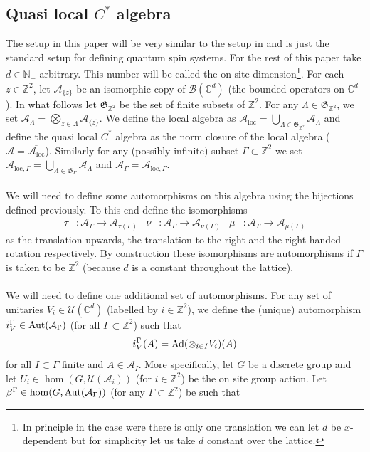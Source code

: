 \documentclass[12pt,a4paper,twoside]{article}
\let\originalleft\left
\let\originalright\right
\renewcommand{\left}{\mathopen{}\mathclose\bgroup\originalleft}
\renewcommand{\right}{\aftergroup\egroup\originalright}
\newcommand{\UU}{\mathcal U}
\newcommand{\BB}{\mathcal B}
\newcommand{\ZZ}{\mathbb Z}
\newcommand{\CC}{\mathbb C}
\renewcommand{\AA}{\mathcal A}
\newcommand{\NN}{\mathbb{N}}
\newcommand{\Ad}[1]{\textrm{Ad}\left(#1\right)}
\newcommand{\Aut}[1]{\textrm{Aut}\left(#1\right)}
\theoremstyle{definition}
\numberwithin{equation}{section}
\begin{document}
\subsection{Quasi local $C^*$ algebra}\label{sec:QuasiLocalC*Algebra}
The setup in this paper will be very similar to the setup in \cite{ogata2021h3gmathbb} and is just the standard setup for defining quantum spin systems. For the rest of this paper take $d\in\NN_+$ arbitrary. This number will be called the on site dimension\footnote{In principle in the case were there is only one translation we can let $d$ be $x$-dependent but for simplicity let us take $d$ constant over the lattice.}. For each $z\in\ZZ^2$, let $\AA_{\{z\}}$ be an isomorphic copy of $\BB(\CC^d)$ (the bounded operators on $\CC^d$). In what follows let $\mathfrak{G}_{\ZZ^2}$ be the set of finite subsets of $\ZZ^2$. For any $\Lambda\in\mathfrak{G}_{\ZZ^2}$, we set $\AA_\Lambda=\bigotimes_{z\in\Lambda}\AA_{\{z\}}$. We define the local algebra as $\AA_{\text{loc}}=\bigcup_{\Lambda\in \mathfrak{G}_{\ZZ^2}}\AA_{\Lambda}$ and define the quasi local $C^*$ algebra as the norm closure of the local algebra ($\AA=\overline{\AA_{\text{loc}}}$). Similarly for any (possibly infinite) subset $\Gamma\subset\ZZ^2$ we set $\AA_{\text{loc},\Gamma}=\bigcup_{\Lambda\in \mathfrak{G}_{\Gamma}}\AA_{\Lambda}$ and $\AA_\Gamma=\overline{\AA_{\text{loc},\Gamma}}$.\\\\
We will need to define some automorphisms on this algebra using the bijections defined previously. To this end define the isomorphisms
\begin{align}
	\tau&:\AA_\Gamma\rightarrow\AA_{\tau(\Gamma)}&\nu&:\AA_\Gamma\rightarrow\AA_{\nu(\Gamma)}&\mu&:\AA_\Gamma\rightarrow\AA_{\mu(\Gamma)}
\end{align}
as the translation upwards, the translation to the right and the right-handed rotation respectively. By construction these isomorphisms are automorphisms if $\Gamma$ is taken to be $\ZZ^2$ (because $d$ is a constant throughout the lattice).\\\\
We will need to define one additional set of automorphisms. For any set of unitaries $V_i\in\UU(\CC^d)$ (labelled by $i\in\ZZ^2$), we define the (unique) automorphism $i_V^\Gamma\in\Aut{\AA_\Gamma}$ (for all $\Gamma\subset \ZZ^2$) such that
\begin{equation}
	i_V^\Gamma (A)=\Ad{\otimes_{i\in I} V_i}(A)
\end{equation}
for all $I\subset\Gamma$ finite and $A\in\AA_I$. More specifically, let $G$ be a discrete group and let $U_i\in\hom(G,\UU(\AA_i))$ (for $i\in\ZZ^2$) be the on site group action. Let $\beta^\Gamma\in\hom(G,\Aut{\AA_\Gamma})$ (for any $\Gamma\subset\ZZ^2$) be such that
\end{document}
